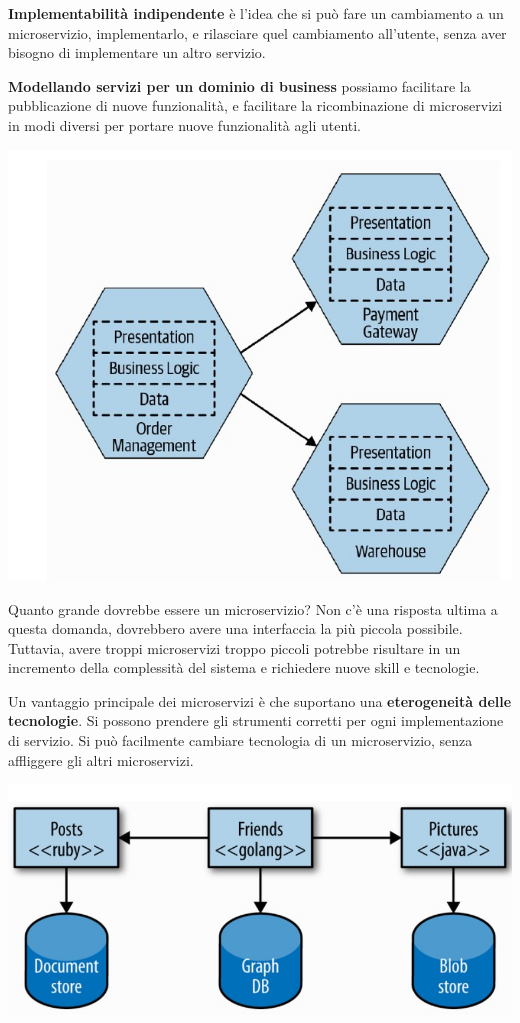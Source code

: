 \textbf{Implementabilità indipendente} è l'idea che si può fare un cambiamento a un microservizio, implementarlo, e rilasciare quel cambiamento all'utente, senza aver bisogno di implementare un altro servizio. 
\begin{multicols}{2}
\textbf{Modellando servizi per un dominio di business} possiamo facilitare la pubblicazione di nuove funzionalità, e facilitare la ricombinazione di microservizi in modi diversi per portare nuove funzionalità agli utenti.
\begin{center}
    \includegraphics[scale = 0.4]{Images/SOA/WhatAreMicroservices2.jpg}
\end{center}
\end{multicols}
Quanto grande dovrebbe essere un microservizio? Non c'è una risposta ultima a questa domanda, dovrebbero avere una interfaccia la più piccola possibile. Tuttavia, avere troppi microservizi troppo piccoli potrebbe risultare in un incremento della complessità del sistema e richiedere nuove skill e tecnologie.

Un vantaggio principale dei microservizi è che suportano una \textbf{eterogeneità delle tecnologie}. Si possono prendere gli strumenti corretti per ogni implementazione di servizio. Si può facilmente cambiare tecnologia di un microservizio, senza affliggere gli altri microservizi.
\begin{center}
    \includegraphics[scale = 0.4]{Images/SOA/WhatAreMicroservices3.jpg}
\end{center}

